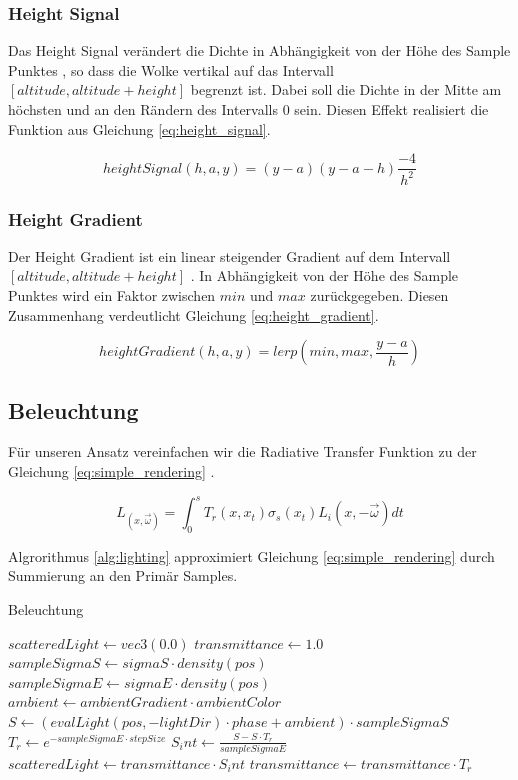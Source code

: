 \subsubsection{Height Signal}
Das Height Signal verändert die Dichte in Abhängigkeit von der Höhe des Sample Punktes \cite{Högfeldt16}, so dass die Wolke vertikal auf das Intervall $ [altitude, altitude + height] $ begrenzt ist. Dabei soll die Dichte in der Mitte am höchsten und an den Rändern des Intervalls $ 0 $ sein. Diesen Effekt realisiert die Funktion aus Gleichung \ref{eq:height_signal}.

\begin{equation}
\label{eq:height_signal}
    heightSignal(h, a, y) = (y - a) (y - a - h) \frac{-4}{h^2}
\end{equation}

\subsubsection{Height Gradient}
Der Height Gradient ist ein linear steigender Gradient auf dem Intervall $ [altitude, altitude + height] $ \cite{Högfeldt16}. In Abhängigkeit von der Höhe des Sample Punktes wird ein Faktor zwischen $ min $ und $ max $ zurückgegeben. Diesen Zusammenhang verdeutlicht Gleichung \ref{eq:height_gradient}.

\begin{equation}
\label{eq:height_gradient}
    heightGradient(h, a, y) = lerp(min, max, \frac{y - a}{h})
\end{equation}

\subsection{Beleuchtung}
Für unseren Ansatz vereinfachen wir die Radiative Transfer Funktion zu der Gleichung \ref{eq:simple_rendering} \cite{Högfeldt16}.

\begin{equation}
\label{eq:simple_rendering}
    L_(x, \vec{\omega}) = \int_{0}^{s} T_r(x, x_t) \sigma_s(x_t) L_i(x, -\vec{\omega}) dt
\end{equation}

Algrorithmus \ref{alg:lighting} approximiert Gleichung \ref{eq:simple_rendering} durch Summierung an den Primär Samples.

\begin{algorithm}[H]
\caption{Beleuchtung \cite{Högfeldt16}}
\label{alg:lighting}
\begin{algorithmic}[1]
\State $ scatteredLight \gets vec3(0.0) $
\State $ transmittance \gets 1.0 $
    \State $ sampleSigmaS \gets sigmaS \cdot density(pos) $
    \State $ sampleSigmaE \gets sigmaE \cdot density(pos) $
    \State $ ambient \gets ambientGradient \cdot ambientColor $
    \State $ S \gets (evalLight(pos, -lightDir) \cdot phase + ambient) \cdot sampleSigmaS $
    \State $ T_r \gets e^{-sampleSigmaE \cdot stepSize} $
    \State $ S_int \gets \frac{S - S \cdot T_r}{sampleSigmaE} $
    \State $ scatteredLight \gets transmittance \cdot S_int $
    \State $ transmittance \gets transmittance \cdot T_r $
\EndFor
\end{algorithmic}
\end{algorithm}

